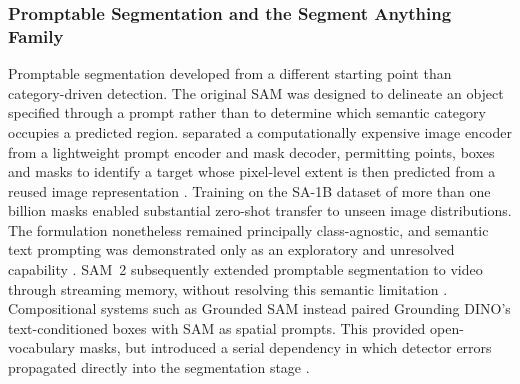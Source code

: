 \subsubsection{Promptable Segmentation and the Segment Anything Family}
\label{sec:bg-sam}
Promptable segmentation developed from a different starting point than category-driven detection. The original \gls{SAM} was designed to delineate an object specified through a prompt rather than to determine which semantic category occupies a predicted region. \citeauthor{kirillov2023segment} separated a computationally expensive image encoder from a lightweight prompt encoder and mask decoder, permitting points, boxes and masks to identify a target whose pixel-level extent is then predicted from a reused image representation \cite{kirillov2023segment}. Training on the SA-1B dataset of more than one billion masks enabled substantial zero-shot transfer to unseen image distributions. The formulation nonetheless remained principally class-agnostic, and semantic text prompting was demonstrated only as an exploratory and unresolved capability \cite{kirillov2023segment}. \gls{SAM}~2 subsequently extended promptable segmentation to video through streaming memory, without resolving this semantic limitation \cite{ravi2024sam2}. Compositional systems such as Grounded SAM instead paired Grounding DINO's text-conditioned boxes with \gls{SAM} as spatial prompts. This provided open-vocabulary masks, but introduced a serial dependency in which detector errors propagated directly into the segmentation stage \cite{ren2024grounded}.

